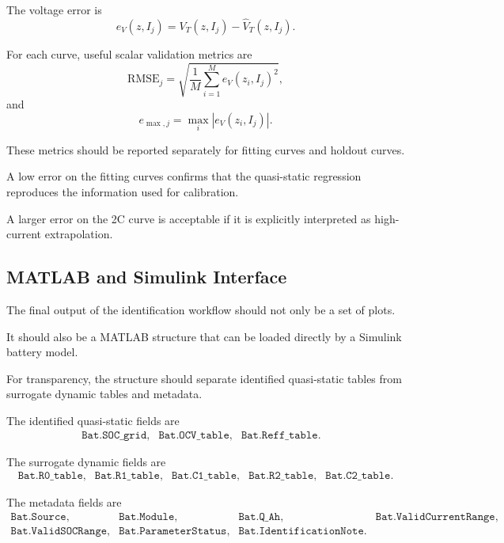 \documentclass[a4paper,12pt]{article}
\begin{document}
The voltage error is
\begin{equation}
e_V(z,I_j)
=
V_T(z,I_j)
-
\hat{V}_T(z,I_j).
\label{eq:data_voltage_error}
\end{equation}

For each curve, useful scalar validation metrics are
\begin{equation}
\mathrm{RMSE}_j
=
\sqrt{
\frac{1}{M}
\sum_{i=1}^{M}
e_V(z_i,I_j)^2
},
\label{eq:data_rmse}
\end{equation}
and
\begin{equation}
e_{\max,j}
=
\max_i
\left|
e_V(z_i,I_j)
\right|.
\label{eq:data_max_error}
\end{equation}

These metrics should be reported separately for fitting curves and holdout curves.

A low error on the fitting curves confirms that the quasi-static regression reproduces the information used for calibration.

A larger error on the 2C curve is acceptable if it is explicitly interpreted as high-current extrapolation.

\subsection{MATLAB and Simulink Interface}

The final output of the identification workflow should not only be a set of plots.

It should also be a MATLAB structure that can be loaded directly by a Simulink battery model.

For transparency, the structure should separate identified quasi-static tables from surrogate dynamic tables and metadata.

The identified quasi-static fields are
\[
\begin{array}{llll}
\texttt{Bat.SOC\_grid}, &
\texttt{Bat.OCV\_table}, &
\texttt{Bat.Reff\_table}. &
\end{array}
\]

The surrogate dynamic fields are
\[
\begin{array}{lllll}
\texttt{Bat.R0\_table}, &
\texttt{Bat.R1\_table}, &
\texttt{Bat.C1\_table}, &
\texttt{Bat.R2\_table}, &
\texttt{Bat.C2\_table}.
\end{array}
\]

The metadata fields are
\[
\begin{array}{llll}
\texttt{Bat.Source}, &
\texttt{Bat.Module}, &
\texttt{Bat.Q\_Ah}, &
\texttt{Bat.ValidCurrentRange},\\
\texttt{Bat.ValidSOCRange}, &
\texttt{Bat.ParameterStatus}, &
\texttt{Bat.IdentificationNote}. &
\end{array}
\]
\end{document}
